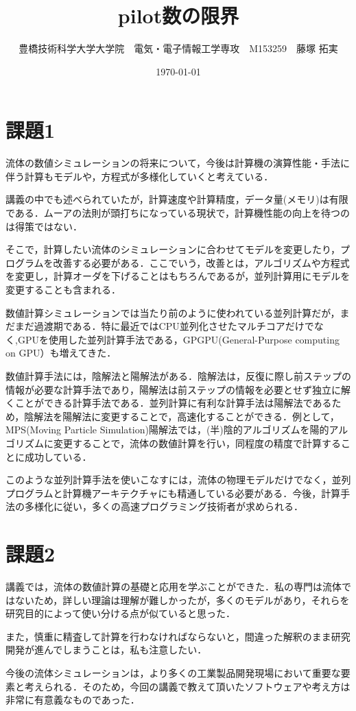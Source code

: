 \documentclass[11pt]{jsarticle}
\title{pilot数の限界}
\author{豊橋技術科学大学大学院　電気・電子情報工学専攻　M153259　藤塚 拓実}
\date{\today}
\begin{document}
\maketitle
\section{課題1}
流体の数値シミュレーションの将来について，今後は計算機の演算性能・手法に伴う計算もモデルや，方程式が多様化していくと考えている．

講義の中でも述べられていたが，計算速度や計算精度，データ量(メモリ)は有限である．ムーアの法則が頭打ちになっている現状で，計算機性能の向上を待つのは得策ではない．


そこで，計算したい流体のシミュレーションに合わせてモデルを変更したり，プログラムを改善する必要がある．ここでいう，改善とは，アルゴリズムや方程式を変更し，計算オーダを下げることはもちろんであるが，並列計算用にモデルを変更することも含まれる．

数値計算シミュレーションでは当たり前のように使われている並列計算だが，まだまだ過渡期である．特に最近ではCPU並列化させたマルチコアだけでなく,GPUを使用した並列計算手法である，GPGPU(General-Purpose computing on GPU）も増えてきた．

数値計算手法には，陰解法と陽解法がある．陰解法は，反復に際し前ステップの情報が必要な計算手法であり，陽解法は前ステップの情報を必要とせず独立に解くことができる計算手法である．並列計算に有利な計算手法は陽解法であるため，陰解法を陽解法に変更することで，高速化することができる．例として，MPS(Moving Particle Simulation)陽解法では，(半)陰的アルゴリズムを陽的アルゴリズムに変更することで，流体の数値計算を行い，同程度の精度で計算することに成功している．

このような並列計算手法を使いこなすには，流体の物理モデルだけでなく，並列プログラムと計算機アーキテクチャにも精通している必要がある．今後，計算手法の多様化に従い，多くの高速プログラミング技術者が求められる．

\section{課題2}
講義では，流体の数値計算の基礎と応用を学ぶことができた．私の専門は流体ではないため，詳しい理論は理解が難しかったが，多くのモデルがあり，それらを研究目的によって使い分ける点が似ていると思った．

また，慎重に精査して計算を行わなければならないと，間違った解釈のまま研究開発が進んでしまうことは，私も注意したい．

今後の流体シミュレーションは，より多くの工業製品開発現場において重要な要素と考えられる．そのため，今回の講義で教えて頂いたソフトウェアや考え方は非常に有意義なものであった．



\end{document}

